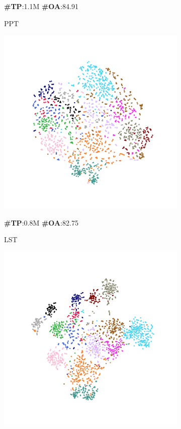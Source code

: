 \begin{figure}
\begin{subfigure}{0.24\textwidth}
        \caption*{\textbf{\#TP}:1.1M \textbf{\#OA}:84.91}
        \caption{PPT}
        \label{fig:sub6}
    \end{subfigure}
    \hfill
    \begin{subfigure}{0.24\textwidth}
        \centering
        \includegraphics[width=\linewidth]{fig/tsne/LST.pdf}
        \caption*{\textbf{\#TP}:0.8M \textbf{\#OA}:82.75}
        \caption{LST}
        \label{fig:sub7}
    \end{subfigure}
    \hfill
    \begin{subfigure}{0.24\textwidth}
        \centering
        \includegraphics[width=\linewidth]{fig/tsne/point_ladder.pdf}

\end{subfigure}
\end{figure}

